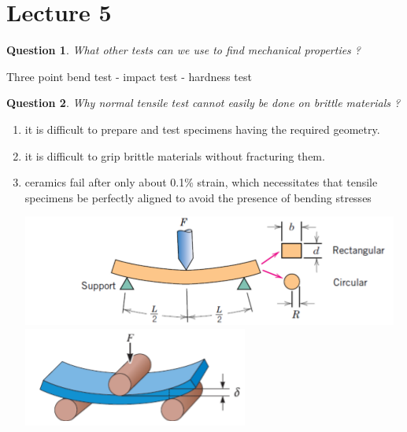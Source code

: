 \documentclass[13]{article}
\newtheorem{exer}{Question}
\begin{document}
\section{Lecture 5}
\begin{exer}
	What other tests can we use to find mechanical properties ?
\end{exer}
Three point bend test - impact test - hardness test
\begin{exer}
Why normal tensile test cannot easily be done on brittle materials ? 
\end{exer}
\begin{enumerate}
\item it is difficult to prepare and test specimens having the required geometry.
\item it is difficult to grip brittle materials without fracturing them.
\item ceramics fail after only about 0.1\% strain, which necessitates that tensile
specimens be perfectly aligned to avoid the presence of bending stresses
\begin{center}
\includegraphics[scale=0.5]{figures/28.png} \includegraphics[scale=0.5]{figures/29.png}
\end{center}
\end{enumerate}
\end{document}
